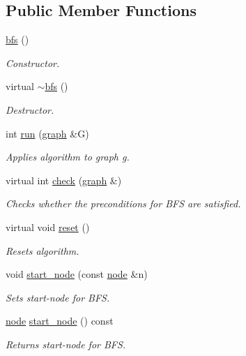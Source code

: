 \subsection*{Public Member Functions}
\begin{DoxyCompactItemize}
\item 
\mbox{\hyperlink{classbfs_a21bcb84fc2db7cf5e789c0459e11c501}{bfs}} ()
\begin{DoxyCompactList}\small\item\em Constructor. \end{DoxyCompactList}\item 
virtual \mbox{\hyperlink{classbfs_a6999a08f3cee2b54f07ffeac0d484df1}{$\sim$bfs}} ()
\begin{DoxyCompactList}\small\item\em Destructor. \end{DoxyCompactList}\item 
int \mbox{\hyperlink{classbfs_a06ae16bd0f3bb2f8eb6b3e36659ba82e}{run}} (\mbox{\hyperlink{classgraph}{graph}} \&G)
\begin{DoxyCompactList}\small\item\em Applies algorithm to graph g. \end{DoxyCompactList}\item 
virtual int \mbox{\hyperlink{classbfs_aafdf63b57eaceb5d95f441be0f9c77bb}{check}} (\mbox{\hyperlink{classgraph}{graph}} \&)
\begin{DoxyCompactList}\small\item\em Checks whether the preconditions for B\+FS are satisfied. \end{DoxyCompactList}\item 
virtual void \mbox{\hyperlink{classbfs_a6398bc230f9723cd5fdd32cd603647cc}{reset}} ()
\begin{DoxyCompactList}\small\item\em Resets algorithm. \end{DoxyCompactList}\item 
void \mbox{\hyperlink{classbfs_a23e2981c2ee617a6e12a8833d2db6210}{start\+\_\+node}} (const \mbox{\hyperlink{classnode}{node}} \&n)
\begin{DoxyCompactList}\small\item\em Sets start-\/node for B\+FS. \end{DoxyCompactList}\item 
\mbox{\hyperlink{classnode}{node}} \mbox{\hyperlink{classbfs_afac59b4a0d92449d8fa46a202b11ae4b}{start\+\_\+node}} () const
\begin{DoxyCompactList}\small\item\em Returns start-\/node for B\+FS. \end{DoxyCompactList}\item 

\end{DoxyCompactItemize}
